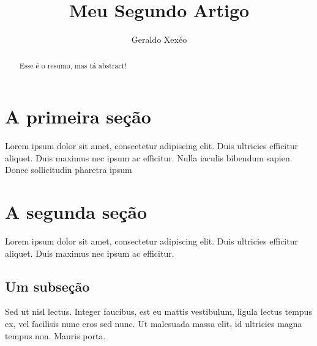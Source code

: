 \documentclass{article}
\title{Meu Segundo Artigo}
\author{Geraldo Xexéo}
\begin{document}
    
\maketitle
\begin{abstract}
    Esse é o resumo, mas tá abstract!
\end{abstract}
    
\section{A primeira seção}

Lorem ipsum dolor sit amet, consectetur adipiscing elit. Duis ultricies efficitur aliquet. Duis maximus nec ipsum ac efficitur. Nulla iaculis bibendum sapien. Donec sollicitudin pharetra ipsum 

\section{A segunda seção}

Lorem ipsum dolor sit amet, consectetur adipiscing elit. Duis ultricies efficitur aliquet. Duis maximus nec ipsum ac efficitur. 

\subsection{Um subseção}


Sed ut nisl lectus. Integer faucibus, est eu mattis vestibulum, ligula lectus tempus ex, vel facilisis nunc eros sed nunc. Ut malesuada massa elit, id ultricies magna tempus non. Mauris porta.     
    
\end{document}
